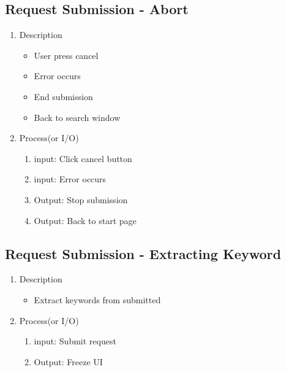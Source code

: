 \documentclass[conference]{IEEEtran}
\begin{document}
\subsection{Request Submission - Abort}
\begin{enumerate}
\item Description
   \begin{itemize}
  \item User press cancel
  \item Error occurs
  \item End submission
  \item Back to search window 
\end{itemize}
\item Process(or I/O)
  \begin{enumerate}
     \item input: Click cancel button
     \item input: Error occurs 
     \item Output: Stop submission
     \item Output: Back to start page
  \end{enumerate}
\end{enumerate}
\textit{}

\subsection{Request Submission - Extracting Keyword}
\begin{enumerate}
\item Description
\begin{itemize}
  \item Extract keywords from submitted  
\end{itemize}
\item Process(or I/O)
  \begin{enumerate}
     \item input: Submit request 
     \item Output: Freeze UI
  \end{enumerate}
\end{enumerate}
\textit{}
\end{document}
